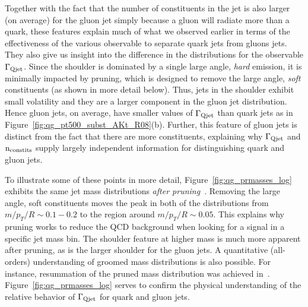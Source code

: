  
Together with  the fact that the number of constituents in the jet is also larger (on average) for the gluon jet simply because a gluon will radiate more than a quark, these features explain much of what we observed earlier in terms of the effectiveness of the various observable to separate quark jets from gluons jets. They also give us insight into the difference in the distributions for the observable 
$\Gamma_{\rm Qjet}$. Since the shoulder is dominated by a single large angle, \textit{hard} emission, it is minimally impacted by pruning,
which is designed to remove the large angle, \textit{soft} constituents (as shown in more detail below). Thus, jets in the shoulder exhibit small volatility and they are a larger
component in the gluon jet distribution.  Hence gluon jets, on average, have smaller values of  $\Gamma_{\rm Qjet}$ than quark jets as in 
Figure~\ref{fig:qg_pt500_subst_AKt_R08}(b).  Further, this feature of gluon jets is distinct from the fact that there are more constituents, explaining why
$\Gamma_{\rm Qjet}$ and $\rm{n_ {\rm constits}}$ supply largely independent information for distinguishing quark and gluon jets. 

To illustrate some of these points in more detail, Figure~\ref{fig:qg_prmasses_log} exhibits the same jet mass distributions  
\textit{after pruning}~\cite{Ellis:2009me,Ellis:2009su}.  Removing the large angle,  soft constituents
moves the peak in both of the distributions from  $m/p_T/R \sim 0.1 - 0.2$ to the region around $m/p_T/R \sim 0.05$.  This explains why pruning works to reduce the
QCD background when looking for a signal in a specific jet mass bin.  The shoulder feature at higher mass is much more apparent after pruning, as is the larger shoulder for
the gluon jets.  A quantitative (all-orders) understanding of groomed mass distributions is also possible. For instance, resummation of the pruned mass distribution was achieved in~\cite{Dasgupta:2013ihk,Dasgupta:2013via}. Figure~\ref{fig:qg_prmasses_log} serves to confirm the physical understanding of the relative behavior of $\Gamma_{\rm Qjet}$ for quark and gluon jets.


